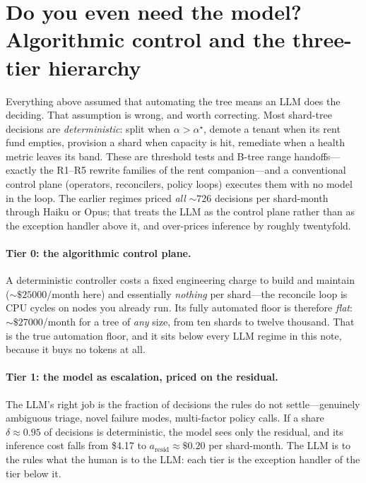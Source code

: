 \documentclass[11pt]{article}
\begin{document}
\section{Do you even need the model? Algorithmic control and the three-tier hierarchy}
\label{sec:algo}

Everything above assumed that automating the tree means an LLM does the deciding. That assumption is
wrong, and worth correcting. Most shard-tree decisions are \emph{deterministic}: split when
$\alpha>\alpha^\star$, demote a tenant when its rent fund empties, provision a shard when capacity is
hit, remediate when a health metric leaves its band. These are threshold tests and B-tree range
handoffs---exactly the R1--R5 rewrite families of the rent companion---and a conventional control
plane (operators, reconcilers, policy loops) executes them with no model in the loop. The earlier
regimes priced \emph{all} $\sim\!\num{726}$ decisions per shard-month through Haiku or Opus; that
treats the LLM as the control plane rather than as the exception handler above it, and over-prices
inference by roughly twentyfold.

\paragraph{Tier 0: the algorithmic control plane.} A deterministic controller costs a fixed
engineering charge to build and maintain ($\sim\$\num{25000}$/month here) and essentially
\emph{nothing} per shard---the reconcile loop is CPU cycles on nodes you already run. Its fully
automated floor is therefore \emph{flat}: $\sim\$\num{27000}$/month for a tree of \emph{any} size,
from ten shards to twelve thousand. That is the true automation floor, and it sits below every LLM
regime in this note, because it buys no tokens at all.

\paragraph{Tier 1: the model as escalation, priced on the residual.} The LLM's right job is the
fraction of decisions the rules do not settle---genuinely ambiguous triage, novel failure modes,
multi-factor policy calls. If a share $\delta\approx\num{0.95}$ of decisions is deterministic, the
model sees only the residual, and its inference cost falls from \$4.17 to
$a_{\text{resid}}\approx\$0.20$ per shard-month. The LLM is to the rules what the human is to the
LLM: each tier is the exception handler of the tier below it.
\end{document}
